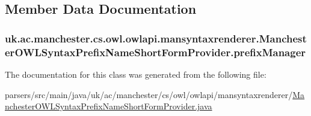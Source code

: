 \subsection{Member Data Documentation}
\hypertarget{classuk_1_1ac_1_1manchester_1_1cs_1_1owl_1_1owlapi_1_1mansyntaxrenderer_1_1_manchester_o_w_l_syn9b805e7397984f62b2f3f095697b987e_ad36de2fc14a17de20a948af6c6c5cef6}{
\subsubsection[{prefix\-Manager}]{ uk.\-ac.\-manchester.\-cs.\-owl.\-owlapi.\-mansyntaxrenderer.\-Manchester\-O\-W\-L\-Syntax\-Prefix\-Name\-Short\-Form\-Provider.\-prefix\-Manager\hspace{0.3cm}{\ttfamily [private]}}}\label{classuk_1_1ac_1_1manchester_1_1cs_1_1owl_1_1owlapi_1_1mansyntaxrenderer_1_1_manchester_o_w_l_syn9b805e7397984f62b2f3f095697b987e_ad36de2fc14a17de20a948af6c6c5cef6}


The documentation for this class was generated from the following file\-:\begin{DoxyCompactItemize}
\item 
parsers/src/main/java/uk/ac/manchester/cs/owl/owlapi/mansyntaxrenderer/\hyperlink{_manchester_o_w_l_syntax_prefix_name_short_form_provider_8java}{Manchester\-O\-W\-L\-Syntax\-Prefix\-Name\-Short\-Form\-Provider.\-java}\end{DoxyCompactItemize}
